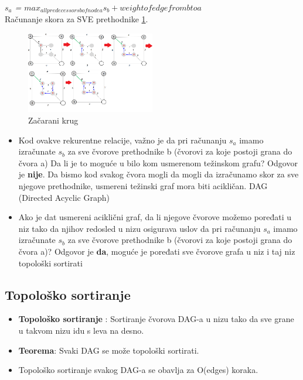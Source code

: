 \textit{$s_a$ = $max_{all predecessors b of node a}{s_b+ weight of edge from b to a}$}
\\

Računanje skora za SVE prethodnike \ref{slika:racunanje}.

\begin{figure}[]
\centering
\includegraphics[width=0.5\textwidth]{poglavlja/5/slike/racunanje.png}
\caption{Začarani krug}
\label{slika:racunanje}
\end{figure}


\begin{itemize}
    \item Kod ovakve rekurentne relacije, važno je da pri računanju $s_a$ imamo izračunate $s_b$ za sve čvorove prethodnike b (čvorovi za koje
postoji grana do čvora a) Da li je to moguće u bilo kom usmerenom
težinskom grafu? Odgovor je \textbf{nije}. Da bismo kod svakog čvora mogli da mogli da izračunamo skor za sve njegove prethodnike, usmereni težinski graf mora biti acikličan. DAG (Directed Acyclic Graph) 
    \item Ako je dat usmereni aciklični graf, da li njegove čvorove možemo poređati u niz tako da njihov redosled u nizu osigurava uslov da pri računanju $s_a$ imamo izračunate $s_b$ za sve čvorove prethodnike b (čvorovi za koje postoji grana do čvora a)? Odgovor je \textbf{da}, moguće je poređati sve čvorove grafa u niz i taj niz topološki sortirati
\end{itemize}




\subsection{Topološko sortiranje}

\begin{itemize}
    \item \textbf{Topološko sortiranje} : Sortiranje čvorova DAG-a u nizu tako da sve grane u takvom nizu idu s leva na desno.
    \item \textbf{ Teorema}: Svaki DAG se može topološki sortirati.
    \item Topološko sortiranje svakog DAG-a se obavlja za O(edges) koraka.
\end{itemize}

